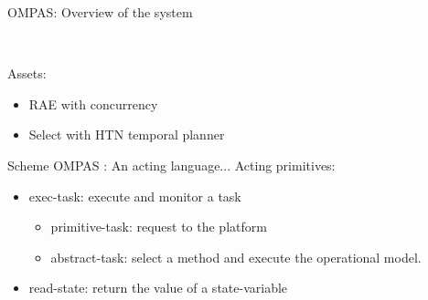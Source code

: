 \begin{frame}{OMPAS: Overview of the system}
\begin{center}

\end{center}
    
~ 

Assets:
    \begin{itemize}
        \item RAE with concurrency
        \item Select with HTN temporal planner
    \end{itemize}
\end{frame}

\begin{frame}{Scheme OMPAS : An acting language...}
    Acting primitives:
\begin{itemize}
\pause
    \item exec-task: execute and monitor a task
\pause
    \begin{itemize}
        \item primitive-task: request to the platform
        \item abstract-task: select a method and execute the operational model.
    \end{itemize}
\pause
    \item read-state: return the value of a state-variable
\end{itemize}
\end{frame}

